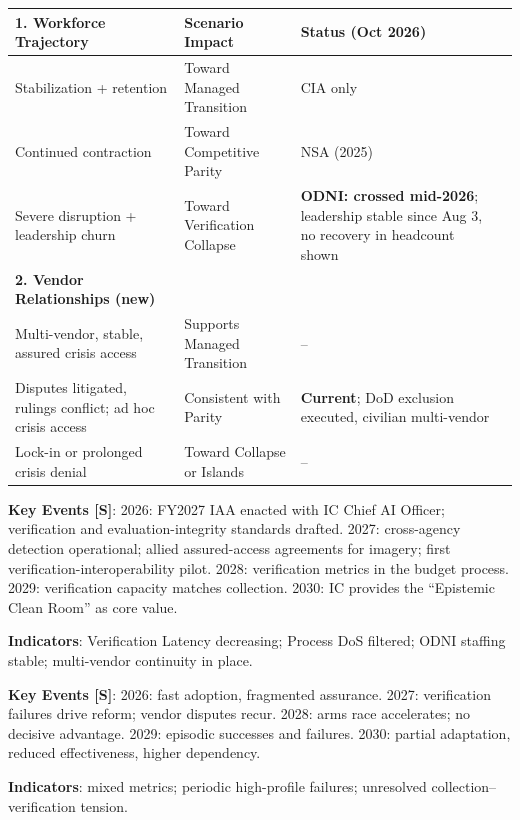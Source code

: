 \documentclass[11pt,letterpaper]{article}
\begin{document}
\begin{criticalbox}
\begin{center}
\scriptsize
\begin{tabularx}{\linewidth}{ZY{1.05}Y{1.05}Y{0.9}}
\toprule
\textbf{1. Workforce Trajectory} & \textbf{Scenario Impact} & \textbf{Status (Oct 2026)} \\
\midrule
Stabilization + retention & Toward Managed Transition & CIA only \\
Continued contraction & Toward Competitive Parity & NSA (2025) \\
Severe disruption + leadership churn & Toward Verification Collapse & \textbf{ODNI: crossed mid-2026}; leadership stable since Aug 3, no recovery in headcount shown \\
\midrule
\textbf{2. Vendor Relationships (new)} & & \\
\midrule
Multi-vendor, stable, assured crisis access & Supports Managed Transition & -- \\
Disputes litigated, rulings conflict; ad hoc crisis access & Consistent with Parity & \textbf{Current}; DoD exclusion executed, civilian multi-vendor \\
Lock-in or prolonged crisis denial & Toward Collapse or Islands & -- \\
\bottomrule
\end{tabularx}
\end{center}
\end{criticalbox}

\begin{scenariobox}
\textbf{Key Events [S]}: 2026: FY2027 IAA enacted with IC Chief AI Officer; verification and evaluation-integrity standards drafted. 2027: cross-agency detection operational; allied assured-access agreements for imagery; first verification-interoperability pilot. 2028: verification metrics in the budget process. 2029: verification capacity matches collection. 2030: IC provides the ``Epistemic Clean Room'' as core value.

\textbf{Indicators}: Verification Latency decreasing; Process DoS filtered; ODNI staffing stable; multi-vendor continuity in place.
\end{scenariobox}

\begin{infobox}
\textbf{Key Events [S]}: 2026: fast adoption, fragmented assurance. 2027: verification failures drive reform; vendor disputes recur. 2028: arms race accelerates; no decisive advantage. 2029: episodic successes and failures. 2030: partial adaptation, reduced effectiveness, higher dependency.

\textbf{Indicators}: mixed metrics; periodic high-profile failures; unresolved collection--verification tension.
\end{infobox}
\end{document}
